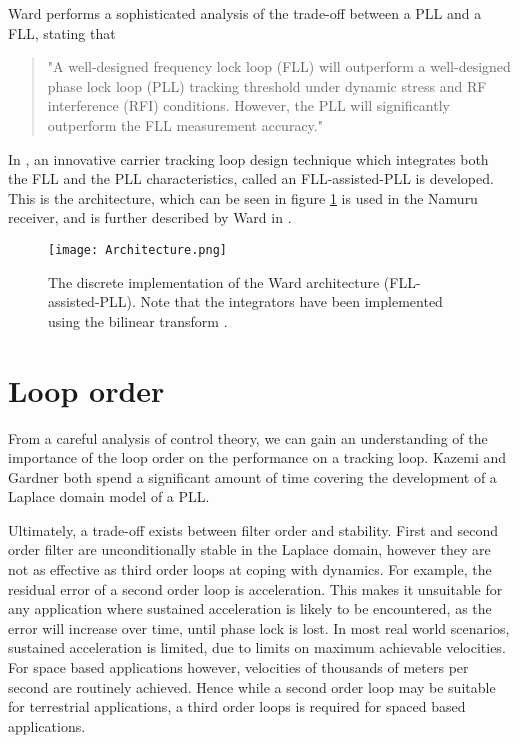 Ward performs a sophisticated analysis of the trade-off between a \ac{PLL} and a \ac{FLL}, stating that 
\begin{quotation}
"A well-designed frequency lock loop (FLL) will outperform
a well-designed phase lock loop (PLL) tracking threshold
under dynamic stress and RF interference (RFI) conditions.
However, the PLL will significantly outperform the FLL
measurement accuracy."\cite{ward1998}
\end{quotation}

In \cite{ward1998}, an innovative carrier tracking loop design technique which
integrates both the FLL and the PLL characteristics, called an FLL-assisted-PLL is developed. This is the architecture, which can be seen in figure \ref{fig:Architecture} is used in the Namuru receiver, and is further described by Ward in \cite{Kaplan}.

\begin{figure}[!htb] 
    \centering
    \texttt{[image: Architecture.png]} 
    \caption{The discrete implementation of the Ward architecture (FLL-assisted-PLL). Note that the integrators have been implemented using the bilinear transform \cite{Ward}.}
    \label{fig:Architecture}
\end{figure}

\section{Loop order}
From a careful analysis of control theory, we can gain an understanding of the importance of the loop order on the performance on a tracking loop. Kazemi \cite{KazemiPHD,Kazemi2008} and Gardner \cite{Gardner} both spend a significant amount of time covering the development of a Laplace domain model of a \ac{PLL}. 

Ultimately, a trade-off exists between filter order and stability. First and second order filter are unconditionally stable in the Laplace domain, however they are not as effective as third order loops at coping with dynamics. For example, the residual error of a second order loop is acceleration. This makes it unsuitable for any application where sustained acceleration is likely to be encountered, as the error will increase over time, until phase lock is lost. In most real world scenarios, sustained acceleration is limited, due to limits on maximum achievable velocities. For space based applications however, velocities of thousands of meters per second are routinely achieved. Hence while a second order loop may be suitable for terrestrial applications, a third order loops is required for spaced based applications. 

